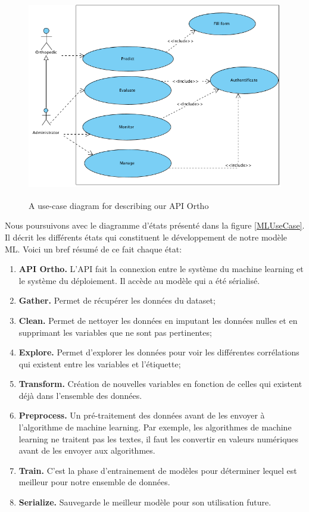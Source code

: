 \documentclass[12pt, french]{report}
\begin{document}
\begin{figure}[h]
	\includegraphics[width=17cm, height =9cm]{images/UseCaseDiag.png}
	\caption{A use-case diagram for describing our API Ortho}
	\label{usecase}
\end{figure}  

Nous poursuivons avec le diagramme d'états présenté dans la figure \ref{MLUseCase}.  Il décrit les différents états qui constituent le développement de notre modèle ML. Voici un bref résumé de ce fait chaque état: 

\begin{enumerate}
\item \textbf{API Ortho.} L'API fait la connexion entre le système du machine learning et le système du déploiement. Il accède au modèle qui a été sérialisé. 
\item \textbf{Gather.} Permet de récupérer les données du dataset;
\item \textbf{Clean.} Permet de nettoyer les données en imputant les données nulles et en supprimant les variables que ne sont pas pertinentes;
\item \textbf{Explore.} Permet d'explorer les données pour voir les différentes corrélations qui existent entre les variables et l'étiquette;
\item \textbf{Transform.} Création de nouvelles variables en fonction de celles qui existent déjà dans l'ensemble des données. 
\item \textbf{Preprocess.} Un pré-traitement des données avant de les envoyer à l'algorithme de machine learning. Par exemple, les algorithmes de machine learning ne traitent pas les textes, il faut les convertir en valeurs numériques avant de les envoyer aux algorithmes. 
\item \textbf{Train.} C'est la phase d'entrainement de modèles pour déterminer lequel est meilleur pour notre ensemble de données.
\item \textbf{Serialize.} Sauvegarde le meilleur modèle pour son utilisation future. 
\end{enumerate}
\end{document}
